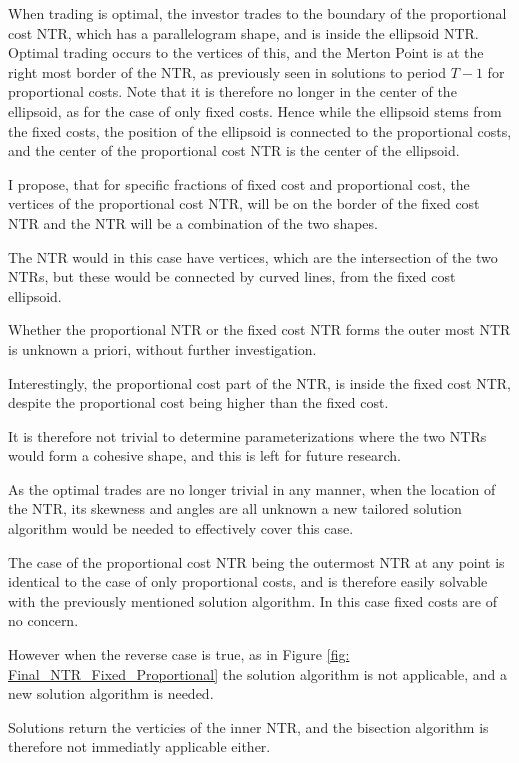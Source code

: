 \documentclass[11pt]{article}
\begin{document}
When trading is optimal, the investor trades to the boundary of the proportional cost NTR, which has a parallelogram shape, and is inside the ellipsoid NTR.
Optimal trading occurs to the vertices of this, and the Merton Point is at the right most border of the NTR, as previously seen in solutions to period $T-1$ for proportional costs.
Note that it is therefore no longer in the center of the ellipsoid, as for the case of only fixed costs.
Hence while the ellipsoid stems from the fixed costs, the position of the ellipsoid is connected to the proportional costs, and the center of the proportional cost NTR is the center of the ellipsoid.

I propose, that for specific fractions of fixed cost and proportional cost, the vertices of the proportional cost NTR,
will be on the border of the fixed cost NTR and the NTR will be a combination of the two shapes.

The NTR would in this case have vertices, which are the intersection of the two NTRs, but these would be connected by curved lines, from the fixed cost ellipsoid.

Whether the proportional NTR or the fixed cost NTR forms the outer most NTR is unknown a priori, without further investigation.

Interestingly, the proportional cost part of the \ac{NTR}, is inside the fixed cost NTR, despite the proportional cost being higher than the fixed cost.

It is therefore not trivial to determine parameterizations where the two NTRs would form a cohesive shape, and this is left for future research.

As the optimal trades are no longer trivial in any manner, when the location of the \ac{NTR}, its skewness and angles are all unknown
a new tailored solution algorithm would be needed to effectively cover this case.

The case of the proportional cost NTR being the outermost NTR at any point is identical to the case of only proportional costs,
and is therefore easily solvable with the previously mentioned solution algorithm. In this case fixed costs are of no concern.

However when the reverse case is true, as in Figure \ref{fig: Final_NTR_Fixed_Proportional} the solution algorithm is not applicable, and a new solution algorithm is needed.

Solutions return the verticies of the inner NTR, and the bisection algorithm is therefore not immediatly applicable either.
\end{document}
